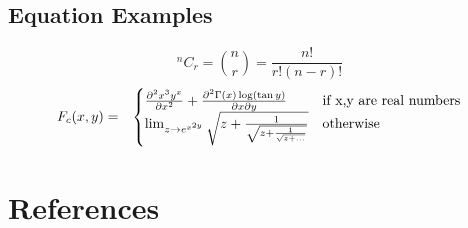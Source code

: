 \documentclass[14pt]{article}
\newcommand*{\MyComb}[2]{{}^{#1}C_{#2}}%
\begin{document}
\subsection{Equation Examples}
\begin{equation}
\MyComb{n}{r} = \binom{n}{r} = \frac{n!}{r!(n-r)!} 
\end{equation}
\pagebreak
$$
\begin{array}{cc}
  F_c(x,y)= & 
    \begin{cases}
     \pdv[2]{x^{3}y^{x}}{x}+ \pdv[2]{\Gamma(x)\log(\tan y)}{x}{y} & \text{if x,y are real numbers} \\
      \lim_{z \to e^{x^{2y}}} \sqrt{z+\frac{1}{\sqrt{z+\frac{1}{\sqrt{z+...}}}}}  & \text{otherwise}
    \end{cases}
\end{array}
$$
\section*{References}
\printbibliography
\end{document}
